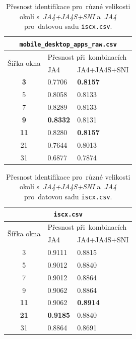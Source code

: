 \begin{table}[H]
	\centering
	\begin{minipage}{0.49\textwidth}
		\centering
		\begin{tabular}{cll}
			\toprule
			\multicolumn{3}{c}{\texttt{mobile\_desktop\_apps\_raw.csv}}  \\
			\midrule
			\multirow{2}{*}{Šířka okna} & \multicolumn{2}{l}{Přesnost při~kombinacích}\\
															    			
			            & JA4             & JA4+JA4S+SNI    \\
			\midrule
			\textbf{3}  & 0.7706          & \textbf{0.8157} \\
			5           & 0.8058          & 0.8133          \\
			7           & 0.8289          & 0.8133          \\
			\textbf{9}  & \textbf{0.8332} & 0.8131          \\
			\textbf{11} & 0.8280          & \textbf{0.8157} \\
			21          & 0.7644          & 0.8013          \\
			31          & 0.6877          & 0.7874          \\
			\bottomrule
		\end{tabular}
		\caption{Přesnost identifikace pro~různé velikosti okolí pro~datovou sadu \texttt{mobile desktop apps raw.csv}.}
		\label{tab:mobile_acc_vs_window}
										        
	\end{minipage}
	\hfill
	\begin{minipage}{0.49\textwidth}
												
		\centering
		\begin{tabular}{cll}
			\toprule
			\multicolumn{3}{c}{\texttt{iscx.csv}}  \\
			\midrule
			\multirow{2}{*}{Šířka okna} & \multicolumn{2}{l}{Přesnost při~kombinacích}\\
																		
			            & JA4             & JA4+JA4S+SNI    \\
			\midrule
			3           & 0.9111          & 0.8815          \\
			5           & 0.9012          & 0.8840          \\
			7           & 0.9012          & 0.8864          \\
			9           & 0.9062          & 0.8864          \\
			\textbf{11} & 0.9062          & \textbf{0.8914} \\
			\textbf{21} & \textbf{0.9185} & 0.8840          \\
			31          & 0.8864          & 0.8691          \\
			\bottomrule
		\end{tabular}
		\caption{Přesnost identifikace pro~různé velikosti okolí s~\textit{JA4+JA4S+SNI} a~\textit{JA4} pro~datovou sadu \texttt{iscx.csv}.}
		\label{tab:iscx_acc_vs_window}
										        
	\end{minipage}
\end{table}

